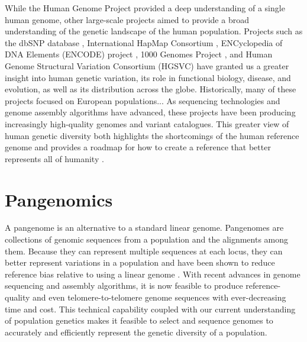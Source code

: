 \documentclass[11pt]{ucscthesis}
\begin{document}
While the Human Genome Project provided a deep understanding of a single human genome, other large-scale projects aimed to provide a broad understanding of the genetic landscape of the human population.
Projects such as the dbSNP database \cite{sherry_dbsnp_2001}, International HapMap Consortium \cite{international_hapmap_consortium_international_2003,international2005haplotype}, ENCyclopedia of DNA Elements (ENCODE) project \cite{encode_project_consortium_encode_2004}, 1000 Genomes Project \cite{1000_genomes_project_consortium_map_2010,1000gp_2015}, and Human Genome Structural Variation Consortium (HGSVC) \cite{chaisson_sv_2019} have granted us a greater insight into human genetic variation, its role in functional biology, disease, and evolution, as well as its distribution across the globe.
Historically, many of these projects focused on European populations...
As sequencing technologies \cite{} and genome assembly algorithms \cite{} have advanced, these projects have been producing increasingly high-quality genomes and variant catalogues. 
This greater view of human genetic diversity both highlights the shortcomings of the human reference genome and provides a roadmap for how to create a reference that better represents all of humanity \cite{ballouz_is_2019,miga_need_2021}.

\section{Pangenomics}
\label{sec:background:pangenomes}


A pangenome is an alternative to a standard linear genome.
Pangenomes are collections of genomic sequences from a population and the alignments among them.
Because they can represent multiple sequences at each locus, they can better represent variations in a population and have been shown to reduce reference bias relative to using a linear genome \cite{sherman_pan-genomics_2020,noauthor_computational_2016,hprc_draft_2023}.
With recent advances in genome sequencing and assembly algorithms, it is now feasible to produce reference-quality and even telomere-to-telomere genome sequences with ever-decreasing time and cost\cite{}.
This technical capability coupled with our current understanding of population genetics makes it feasible to select and sequence genomes to accurately and efficiently represent the genetic diversity of a population. 
\end{document}
